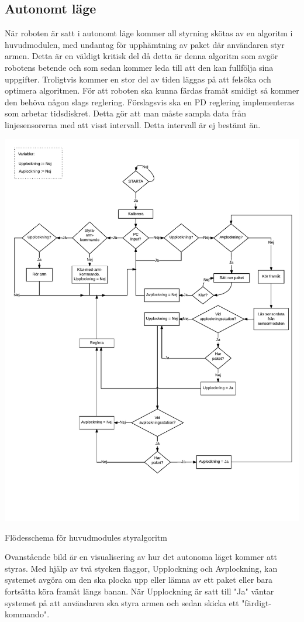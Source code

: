 \subsection{Autonomt läge}
När roboten är satt i autonomt läge kommer all styrning skötas av en algoritm i huvudmodulen, med undantag för upphämtning av paket där användaren styr armen. Detta är en väldigt kritisk del då detta är denna algoritm som avgör robotens betende och som sedan kommer leda till att den kan fullfölja sina uppgifter. Troligtvis kommer en stor del av tiden läggas på att felsöka och optimera algoritmen.
För att roboten ska kunna färdas framåt smidigt så kommer den behöva någon slags reglering. Förslagsvis ska en PD reglering implementeras som arbetar tidsdiskret. Detta gör att man måste sampla data från linjesensorerna med att visst intervall. Detta intervall är ej bestämt än.
\newline
\newline
\centerline{\includegraphics[scale=0.6]{Styrlogik.pdf}}
\centerline{Flödesschema för huvudmodules styralgoritm}
\newline
\newline
Ovanstående bild är en visualisering av hur det autonoma läget kommer att styras. Med hjälp av två stycken flaggor, Upplockning och Avplockning, kan systemet avgöra om den ska plocka upp eller lämna av ett paket eller bara fortsätta köra framåt längs banan. När Upplockning är satt till "Ja" väntar systemet på att användaren ska styra armen och sedan skicka ett "färdigt-kommando".
